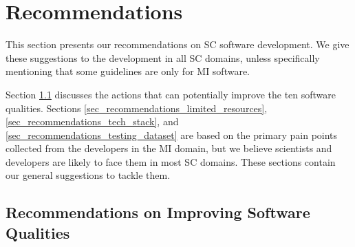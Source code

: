 \chapter{Recommendations}
\label{ch_recommendations}

This section presents our recommendations on SC software development. We give these suggestions to the development in all SC domains, unless specifically mentioning that some guidelines are only for MI software.

Section \ref{sec_recommendations_qualities} discusses the actions that can potentially improve the ten software qualities. Sections \ref{sec_recommendations_limited_resources}, \ref{sec_recommendations_tech_stack}, and \ref{sec_recommendations_testing_dataset} are based on the primary pain points collected from the developers in the MI domain, but we believe scientists and developers are likely to face them in most SC domains. These sections contain our general suggestions to tackle them. 

\section{Recommendations on Improving Software Qualities}
\label{sec_recommendations_qualities}

